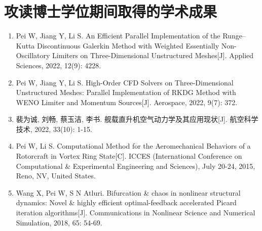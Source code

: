 \chapter{攻读博士学位期间取得的学术成果}

\begin{enumerate}
\item
Pei W, Jiang Y, Li S. An Efficient Parallel Implementation of the Runge–Kutta Discontinuous Galerkin Method with Weighted Essentially Non-Oscillatory Limiters on Three-Dimensional Unstructured Meshes[J]. {Applied Sciences}, 2022, 12(9): 4228.

\item
Pei W, Jiang Y, Li S. High-Order CFD Solvers on Three-Dimensional Unstructured Meshes: Parallel Implementation of RKDG Method with WENO Limiter and Momentum Sources[J]. {Aerospace}, 2022, 9(7): 372.

\item
裴为诚, 刘畅, 蔡玉洁, 李书. 舰载直升机空气动力学及其应用现状[J]. {航空科学技术}, 2022, 33(10): 1-15.

\item
Pei W, Li S. Computational Method for the Aeromechanical Behaviors of a Rotorcraft in Vortex Ring State[C]. {ICCES (International Conference on Computational \& Experimental Engineering and Sciences)}, July 20-24, 2015, Reno, NV, United States.

\item
Wang X, Pei W, S N Atluri. 
Bifurcation \& chaos in nonlinear structural dynamics: Novel \& highly efficient optimal-feedback accelerated Picard iteration algorithms[J]. {Communications in Nonlinear Science and Numerical Simulation}, 2018, 65: 54-69.
\end{enumerate}

